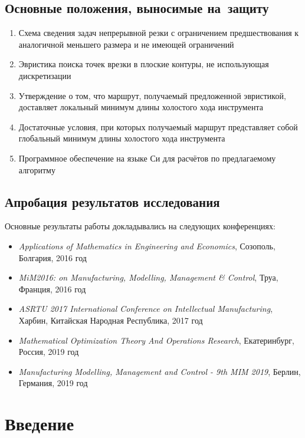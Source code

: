 \documentclass[14pt]{extarticle}
\theoremstyle{plain}%
\theoremstyle{remark}
\begin{document}
\subsection*{Основные положения, выносимые на~защиту}

\begin{enumerate}
  \item
  Схема сведения задач непрерывной резки
  с ограничением предшествования
  к аналогичной
  меньшего размера и
  не имеющей ограничений
  \item
  Эвристика поиска точек врезки в плоские контуры,
  не использующая дискретизации
  \item
  Утверждение о том,
  что маршрут,
  получаемый предложенной эвристикой,
  доставляет локальный минимум
  длины холостого хода инструмента
  \item
  Достаточные условия,
  при которых получаемый маршрут
  представляет собой глобальный
  минимум длины холостого хода инструмента
  \item
  Программное обеспечение на языке Си
  для расчётов по предлагаемому алгоритму
\end{enumerate}

\subsection*{Апробация результатов исследования}

Основные результаты работы докладывались на
следующих конференциях:

\begin{itemize}
  \item
  \textit{Applications of Mathematics in Engineering and Economics},
  Созополь, Болгария, 2016 год
  \item
  \textit{MiM2016: on Manufacturing, Modelling, Management \& Control},
  Труа, Франция, 2016 год
  \item
  \textit{ASRTU 2017 International Conference on Intellectual Manufacturing},
  Харбин, Китайская Народная Республика, 2017 год
  \item
  \textit{Mathematical Optimization Theory And Operations Research},
  Екатеринбург, Россия, 2019 год
  \item
  \textit{Manufacturing Modelling, Management and Control - 9th MIM 2019},
  Берлин, Германия, 2019 год
\end{itemize}

\section{Введение}
\end{document}
